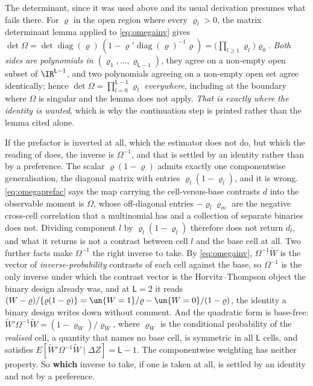 The determinant, since it was used above and its usual derivation presumes what fails there. For
$\varrho$ in the open region where every $\varrho_l>0$, the matrix determinant lemma applied to
\eqref{eq:omegainv} gives
$\det\Omega=\det\operatorname{diag}(\varrho)\,(1-\varrho'\operatorname{diag}(\varrho)^{-1}\varrho)
=\big(\prod_{l\ge1}\varrho_l\big)\varrho_0$. \emph{Both sides are polynomials in
$(\varrho_1,\dots,\varrho_{\mathsf L-1})$}, they agree on a non-empty open subset of
$\IR^{\mathsf L-1}$, and two polynomials agreeing on a non-empty open set agree identically; hence
$\det\Omega=\prod_{l=0}^{\mathsf L-1}\varrho_l$ \emph{everywhere}, including at the boundary where
$\Omega$ is singular and the lemma does not apply. \emph{That is exactly where the identity is wanted},
which is why the continuation step is printed rather than the lemma cited alone.

\medskip
\noindent
 If the prefactor is inverted at all, which the estimator does not do, but which the reading of
 does, the inverse is $\Omega^{-1}$, and that is settled by an identity rather
than by a preference.
The scalar $\varrho(1-\varrho)$ admits exactly one componentwise generalisation, the diagonal
matrix with entries $\varrho_l(1-\varrho_l)$, and it is wrong. \eqref{eq:omegaprefac} says the map
carrying the cell-versus-base contrasts $d$ into the observable moment is $\Omega$, whose off-diagonal
entries $-\varrho_l\varrho_m$ are the negative cross-cell correlation that a multinomial has and a
collection of separate binaries does not. Dividing component $l$ by $\varrho_l(1-\varrho_l)$ therefore
does not return $d_l$, and what it returns is not a contrast between cell $l$ and the base cell at all.
Two further facts make $\Omega^{-1}$ the right inverse to take. By \eqref{eq:omegainv},
$\Omega^{-1}\widetilde W$ is the vector of \emph{inverse-probability} contrasts of each cell against the
base, so $\Omega^{-1}$ is the only inverse under which the contrast vector is the
Horvitz--Thompson object the binary design already was, and at $\mathsf L=2$ it reads
$(W-\varrho)/\{\varrho(1-\varrho)\}=\un\{W=1\}/\varrho-\un\{W=0\}/(1-\varrho)$, the identity a binary
design writes down without comment. And the quadratic form is base-free:
$\widetilde W'\Omega^{-1}\widetilde W=(1-\varrho_W)/\varrho_W$, where $\varrho_W$ is the conditional
probability of the \emph{realised} cell, a quantity that names no base cell, is symmetric in all
$\mathsf L$ cells, and satisfies $E[\widetilde W'\Omega^{-1}\widetilde W\mid\Delta Z]=\mathsf L-1$. The
componentwise weighting has neither property. So \textbf{which} inverse to take, if one is taken at
all, is settled by an identity and not by a preference.

